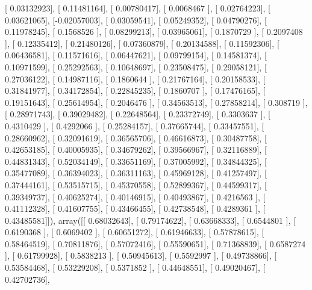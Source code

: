 \documentclass{article}
\begin{document}
       [ 0.03132923],
       [ 0.11481164],
       [ 0.00780417],
       [ 0.0068467 ],
       [ 0.02764223],
       [ 0.03621065],
       [-0.02057003],
       [ 0.03059541],
       [ 0.05249352],
       [ 0.04790276],
       [ 0.11978245],
       [ 0.1568526 ],
       [ 0.08299213],
       [ 0.03965061],
       [ 0.1870729 ],
       [ 0.2097408 ],
       [ 0.12335412],
       [ 0.21480126],
       [ 0.07360879],
       [ 0.20134588],
       [ 0.11592306],
       [ 0.06436581],
       [ 0.11571616],
       [ 0.06447621],
       [ 0.09799154],
       [ 0.14581374],
       [ 0.10971599],
       [ 0.25292563],
       [ 0.10648697],
       [ 0.23508475],
       [ 0.29058121],
       [ 0.27036122],
       [ 0.14987116],
       [ 0.1860644 ],
       [ 0.21767164],
       [ 0.20158533],
       [ 0.31841977],
       [ 0.34172854],
       [ 0.22845235],
       [ 0.1860707 ],
       [ 0.17476165],
       [ 0.19151643],
       [ 0.25614954],
       [ 0.2046476 ],
       [ 0.34563513],
       [ 0.27858214],
       [ 0.308719  ],
       [ 0.28971743],
       [ 0.39029482],
       [ 0.22648564],
       [ 0.23372749],
       [ 0.3303637 ],
       [ 0.4310429 ],
       [ 0.4292066 ],
       [ 0.25284157],
       [ 0.37665744],
       [ 0.33457551],
       [ 0.28660962],
       [ 0.32091619],
       [ 0.36565706],
       [ 0.46616873],
       [ 0.30487758],
       [ 0.42653185],
       [ 0.40005935],
       [ 0.34679262],
       [ 0.39566967],
       [ 0.32116889],
       [ 0.44831343],
       [ 0.52034149],
       [ 0.33651169],
       [ 0.37005992],
       [ 0.34844325],
       [ 0.35477089],
       [ 0.36394023],
       [ 0.36311163],
       [ 0.45969128],
       [ 0.41257497],
       [ 0.37444161],
       [ 0.53515715],
       [ 0.45370558],
       [ 0.52899367],
       [ 0.44599317],
       [ 0.39349737],
       [ 0.40625274],
       [ 0.40146915],
       [ 0.40493867],
       [ 0.4216563 ],
       [ 0.41112328],
       [ 0.41607755],
       [ 0.43466455],
       [ 0.42738548],
       [ 0.4289361 ],
       [ 0.43485581]]), array([[ 0.68032643],
       [ 0.79174622],
       [ 0.63668333],
       [ 0.6544801 ],
       [ 0.6190368 ],
       [ 0.6069402 ],
       [ 0.60651272],
       [ 0.61946633],
       [ 0.57878615],
       [ 0.58464519],
       [ 0.70811876],
       [ 0.57072416],
       [ 0.55590651],
       [ 0.71368839],
       [ 0.6587274 ],
       [ 0.61799928],
       [ 0.5838213 ],
       [ 0.50945613],
       [ 0.5592997 ],
       [ 0.49738866],
       [ 0.53584468],
       [ 0.53229208],
       [ 0.5371852 ],
       [ 0.44648551],
       [ 0.49020467],
       [ 0.42702736],
\end{document}
